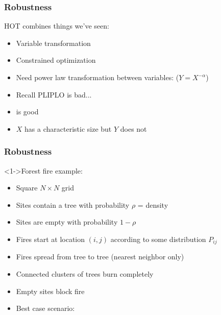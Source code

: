 \begin{frame}
  \frametitle{Robustness}

  \begin{block}{HOT combines things we've seen:}
    \begin{itemize}
    \item<1-> 
      Variable transformation
    \item<2-> 
      Constrained optimization
    \end{itemize}
  \end{block}

  \begin{block}{}
  \begin{itemize}
  \item<3-> 
    Need power law transformation
    between variables: \alert{($Y = X^{-\alpha}$)}
  \item<4-> 
    Recall PLIPLO is bad...
  \item<5-> 
     is good
  \item<7-> 
    $X$ has a characteristic size but $Y$ does not
  \end{itemize}
  \end{block}

\end{frame}


\begin{frame}
  \frametitle{Robustness}

  \begin{block}<1->{Forest fire example:\cite{carlson2000a}}
    \begin{itemize}
    \item<2-> Square $N\times{}N$ grid
    \item<3-> Sites contain a tree with probability $\rho$ = density
    \item<4-> Sites are empty with probability $1-\rho$
    \item<5-> Fires start at location $(i,j)$ according to some distribution $P_{ij}$
    \item<6-> Fires spread from tree to tree (nearest neighbor only)
    \item<7-> Connected clusters of trees burn completely
    \item<8-> Empty sites block fire
    \item<9-> \alert{Best case scenario:}\\
    \end{itemize}
  \end{block}

\end{frame}


